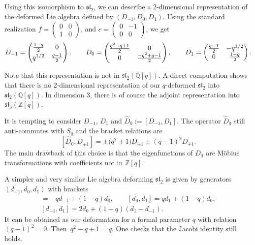 \documentclass[10pt,a4paper]{amsart}
\numberwithin{equation}{section}
\newcommand*{\Z}{\mathbb{Z}}
\begin{document}
Using this isomorphism to $\mathfrak{sl}_2$, we can describe a 2-dimensional representation of the deformed Lie algebra defined by $(D_{-1}, D_0, D_1)$. Using the standard realization $f=\left(\begin{smallmatrix}0 & 0 \\1 & 0\end{smallmatrix}\right)$,  and $e=\left(\begin{smallmatrix}0 & -1 \\0 & 0\end{smallmatrix}\right)$, we get
\[
D_{-1}=\begin{pmatrix}\tfrac{1-q}{2}&0\vspace{1mm} \\q^{1/2} & \tfrac{q-1}{2}\end{pmatrix}, \qquad D_0=\begin{pmatrix}\tfrac{q^2-q+1}{2}&0\\0 & \tfrac{-q^2+q-1}{2}\end{pmatrix}, \qquad D_{1}=\begin{pmatrix}\tfrac{q-1}{2}& -q^{1/2}\\0 & \tfrac{1-q}{2}\end{pmatrix}.
\]

Note that this representation is not in $\mathfrak{sl}_2(\mathbb{Q}[q])$. A direct computation shows that there is no 2-dimensional representation of our $q$-deformed $\mathfrak{sl}_2$ into $\mathfrak{sl}_2(\mathbb{Q}[q])$. In dimension 3, there is of course the adjoint representation into $\mathfrak{sl}_3(\Z[q])$.

\begin{Remark}
It is tempting to consider $D_{-1}$, $D_1$ and $\widehat{D}_0:=[D_{-1},D_1]$. The operator $\widehat{D}_0$ still anti-commutes with $S_q$ and the bracket relations are
\[
[\widehat{D}_0,D_{\pm 1}]=\pm \big(q^2+1\big)D_{\pm 1}\pm (q-1)^2D_{\mp 1}.\]
The main drawback of this choice is that the eigenfunctions of $\widehat{D}_0$ are M\"obius transformations with coefficients not in $\Z[q]$.
\end{Remark}

\begin{Remark}\label{Rk:mod-square}
A simpler and very similar Lie algebra deforming $\mathfrak{sl}_2$ is given by generators $(d_{-1},d_0,d_1)$ with brackets
\begin{gather*}
[d_0,d_{-1}]= -qd_{-1} + (1 - q)d_0, \qquad [d_0,d_1]=qd_1 + (1 - q)d_0,\\ [d_{-1},d_{1}]=2d_0 + (1 - q)(d_{1} - d_{-1}).
\end{gather*}
It can be obtained as our deformation for a formal parameter $q$ with relation $(q-1)^2=0$. Then~${q^2-q+1=q}$. One checks that the Jacobi identity still holds.
\end{Remark}
\end{document}
